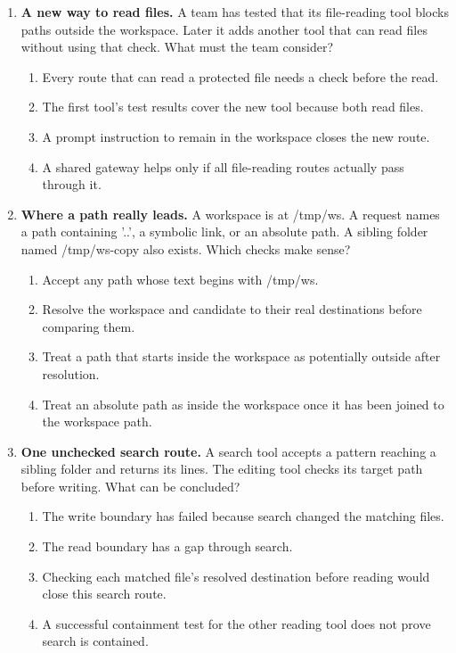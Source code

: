 \begin{enumerate}[start=31,itemsep=0.7\baselineskip]
\item\label{exercise:38} \begin{minipage}[t]{\linewidth}
\textbf{A new way to read files.} A team has tested that its file-reading tool blocks paths outside the workspace. Later it adds another tool that can read files without using that check. What must the team consider?
\begin{enumerate}[label=\textnormal{(\Alph*)},leftmargin=*,itemsep=0pt]
\item Every route that can read a protected file needs a check before the read.
\item The first tool's test results cover the new tool because both read files.
\item A prompt instruction to remain in the workspace closes the new route.
\item A shared gateway helps only if all file-reading routes actually pass through it.
\end{enumerate}
\end{minipage}

\item\label{exercise:39} \begin{minipage}[t]{\linewidth}
\textbf{Where a path really leads.} A workspace is at /tmp/ws. A request names a path containing '..', a symbolic link, or an absolute path. A sibling folder named /tmp/ws-copy also exists. Which checks make sense?
\begin{enumerate}[label=\textnormal{(\Alph*)},leftmargin=*,itemsep=0pt]
\item Accept any path whose text begins with /tmp/ws.
\item Resolve the workspace and candidate to their real destinations before comparing them.
\item Treat a path that starts inside the workspace as potentially outside after resolution.
\item Treat an absolute path as inside the workspace once it has been joined to the workspace path.
\end{enumerate}
\end{minipage}

\item\label{exercise:40} \begin{minipage}[t]{\linewidth}
\textbf{One unchecked search route.} A search tool accepts a pattern reaching a sibling folder and returns its lines. The editing tool checks its target path before writing. What can be concluded?
\begin{enumerate}[label=\textnormal{(\Alph*)},leftmargin=*,itemsep=0pt]
\item The write boundary has failed because search changed the matching files.
\item The read boundary has a gap through search.
\item Checking each matched file's resolved destination before reading would close this search route.
\item A successful containment test for the other reading tool does not prove search is contained.
\end{enumerate}
\end{minipage}


\end{enumerate}
